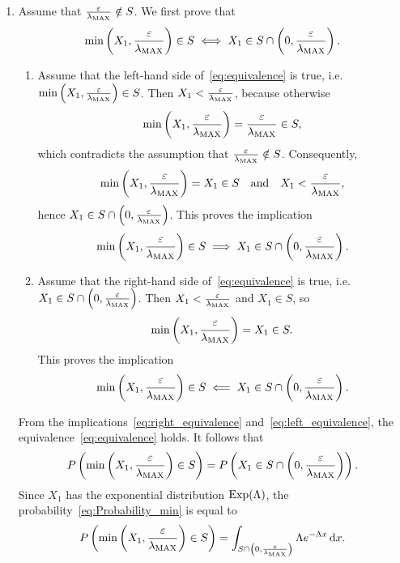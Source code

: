 \begin{enumerate}[label=\arabic*., topsep=10pt]
\item Assume that $\frac{\varepsilon}{\lambda_{\mathrm{MAX}}} \notin S$. We first prove that
\begin{equation}
\min\left(X_1, \frac{\varepsilon}{\lambda_{\mathrm{MAX}}} \right) \in S \iff X_1 \in S \cap \left(0, \frac{\varepsilon}{\lambda_{\mathrm{MAX}}}\right).
\label{eq:equivalence}
\end{equation}
\begin{enumerate}[label=(\alph*)]
  \item Assume that the left-hand side of~\eqref{eq:equivalence} is true, i.e.\ $\min\left(X_1, \frac{\varepsilon}{\lambda_{\mathrm{MAX}}} \right) \in S$. Then $X_1 < \frac{\varepsilon}{\lambda_{\mathrm{MAX}}}$, because otherwise
  \[
  \min\left(X_1, \frac{\varepsilon}{\lambda_{\mathrm{MAX}}} \right) = \frac{\varepsilon}{\lambda_{\mathrm{MAX}}} \in S,
  \]
  which contradicts the assumption that $\frac{\varepsilon}{\lambda_{\mathrm{MAX}}} \notin S$. Consequently,
  \[
  \min\left(X_1, \frac{\varepsilon}{\lambda_{\mathrm{MAX}}} \right) = X_1 \in S \quad\text{and}\quad X_1 < \frac{\varepsilon}{\lambda_{\mathrm{MAX}}},
  \]
  hence $X_1 \in S \cap \left(0, \frac{\varepsilon}{\lambda_{\mathrm{MAX}}}\right)$. This proves the implication
  \begin{equation}
  \min\left(X_1, \frac{\varepsilon}{\lambda_{\mathrm{MAX}}} \right) \in S \implies X_1 \in S \cap \left(0, \frac{\varepsilon}{\lambda_{\mathrm{MAX}}}\right).
  \label{eq:right_equivalence}
  \end{equation}

  \item Assume that the right-hand side of~\eqref{eq:equivalence} is true, i.e.\ $X_1 \in S \cap \left(0, \frac{\varepsilon}{\lambda_{\mathrm{MAX}}}\right)$. Then $X_1 < \frac{\varepsilon}{\lambda_{\mathrm{MAX}}}$ and $X_1 \in S$, so
  \[
  \min\left(X_1, \frac{\varepsilon}{\lambda_{\mathrm{MAX}}} \right) = X_1 \in S.
  \]
  This proves the implication
  \begin{equation}
  \min\left(X_1, \frac{\varepsilon}{\lambda_{\mathrm{MAX}}} \right) \in S \impliedby X_1 \in S \cap \left(0, \frac{\varepsilon}{\lambda_{\mathrm{MAX}}}\right).
  \label{eq:left_equivalence}
  \end{equation}
\end{enumerate}
From the implications~\eqref{eq:right_equivalence} and~\eqref{eq:left_equivalence}, the equivalence~\eqref{eq:equivalence} holds. It follows that
\begin{equation}
P\left(\min\left(X_1, \frac{\varepsilon}{\lambda_{\mathrm{MAX}}} \right) \in S \right) = P\left(X_1 \in S \cap \left(0, \frac{\varepsilon}{\lambda_{\mathrm{MAX}}}\right) \right).
\label{eq:Probability_min}
\end{equation}
Since $X_1$ has the exponential distribution $\operatorname{Exp}(\Lambda)$, the probability~\eqref{eq:Probability_min} is equal to
\begin{equation}
P\left(\min\left(X_1, \frac{\varepsilon}{\lambda_{\mathrm{MAX}}} \right) \in S \right) = \int_{S \cap \left(0, \frac{\varepsilon}{\lambda_{\mathrm{MAX}}}\right)} \Lambda e^{-\Lambda x} \,\mathrm{d} x.
\label{eq:Probability_min_2}
\end{equation}


\end{enumerate}
